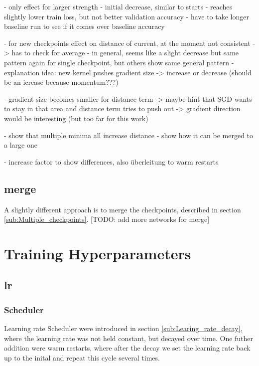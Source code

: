 - only effect for larger strength
- initial decrease, similar to starts
- reaches slightly lower train loss, but not better validation accuracy
- have to take longer baseline run to see if it comes over baseline accuracy

- for new checkpoints effect on distance of current, at the moment not consistent -> has to check for average
- in general, seems like a slight decrease but same pattern again for single checkpoint, but others show same general pattern
- explanation idea: new kernel pushes gradient size -> increase or decrease (should be an icrease because momentum???)

- gradient size becomes smaller for distance term -> maybe hint that SGD wants
to stay in that area and distance term tries to push out -> gradient direction
would be interesting (but too far for this work)



- show that multiple minima all increase distance
- show how it can be merged to a large one

- increase factor to show differences, also überleitung to warm restarts
\subsection{merge}
A slightly different approach is to merge the checkpoints, described in section
\ref{sub:Multiple_checkpoints}.
[TODO: add more networks for merge]









\section{Training Hyperparameters}\label{res:Training}
\subsection{lr}\label{res:Learning rate}
\subsubsection{Scheduler}
Learning rate Scheduler were introduced in section \ref{sub:Learing_rate_decay},
where the learning rate was not held constant, but decayed over time. One futher
addition were warm restarts, where after the decay we set the learning rate back
up to the inital and repeat this cycle several times.

